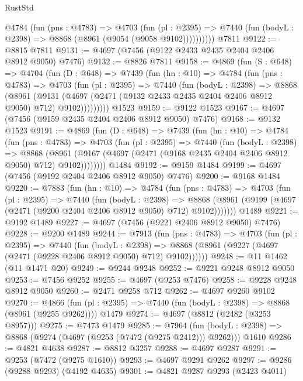 \begin{lexlean}{RustStd}
\begin{coremodule}
          @4784
            (fun (pns : @4783) =>
            @4703
              (fun (pl : @2395) =>
              @7440 (fun (bodyL : @2398) => @8868 (@8961 (@9054 (@9058 @9102))))))))))
    @7811
@9122 := @8815 @7811
@9131 := @4697 (@7456 (@9122 @2433 @2435 @2404 @2406 @8912 @9050) @7476)
@9132 := @8826 @7811
@9158 := @4869
    (fun (S : @648) =>
    @4704
      (fun (D : @648) =>
      @7439
        (fun (hn : @10) =>
        @4784
          (fun (pns : @4783) =>
          @4703
            (fun (pl : @2395) =>
            @7440
              (fun (bodyL : @2398) =>
              @8868
                (@8961
                  (@9131
                    (@4697 (@2471 (@9132 @2433 @2435 @2404 @2406 @8912 @9050) @712) @9102)))))))))
    @1523
@9159 := @9122 @1523
@9167 := @4697 (@7456 (@9159 @2435 @2404 @2406 @8912 @9050) @7476)
@9168 := @9132 @1523
@9191 := @4869
    (fun (D : @648) =>
    @7439
      (fun (hn : @10) =>
      @4784
        (fun (pns : @4783) =>
        @4703
          (fun (pl : @2395) =>
          @7440
            (fun (bodyL : @2398) =>
            @8868
              (@8961 (@9167 (@4697 (@2471 (@9168 @2435 @2404 @2406 @8912 @9050) @712) @9102))))))))
    @1484
@9192 := @9159 @1484
@9199 := @4697 (@7456 (@9192 @2404 @2406 @8912 @9050) @7476)
@9200 := @9168 @1484
@9220 := @7883
    (fun (hn : @10) =>
    @4784
      (fun (pns : @4783) =>
      @4703
        (fun (pl : @2395) =>
        @7440
          (fun (bodyL : @2398) =>
          @8868 (@8961 (@9199 (@4697 (@2471 (@9200 @2404 @2406 @8912 @9050) @712) @9102)))))))
    @1489
@9221 := @9192 @1489
@9227 := @4697 (@7456 (@9221 @2406 @8912 @9050) @7476)
@9228 := @9200 @1489
@9244 := @7913
    (fun (pns : @4783) =>
    @4703
      (fun (pl : @2395) =>
      @7440
        (fun (bodyL : @2398) =>
        @8868 (@8961 (@9227 (@4697 (@2471 (@9228 @2406 @8912 @9050) @712) @9102))))))
@9248 := @11 @1462 (@11 @1471 @20)
@9249 := @9244 @9248
@9252 := @9221 @9248 @8912 @9050
@9253 := @7456 @9252
@9255 := @4697 (@9253 @7476)
@9258 := @9228 @9248 @8912 @9050
@9260 := @2471 @9258 @712
@9262 := @4697 @9260 @9102
@9270 := @4866
    (fun (pl : @2395) => @7440 (fun (bodyL : @2398) => @8868 (@8961 (@9255 @9262))))
    @1479
@9274 := @4697 (@8812 (@2482 (@3253 @8957)))
@9275 := @7473 @1479
@9285 := @7964
    (fun (bodyL : @2398) => @8868 (@9274 (@4697 (@9253 (@7472 (@9275 @2412))) @9262)))
    @1610
@9286 := @4821 @4638
@9287 := @8812 @3257
@9288 := @4697 @9287
@9291 := @9253 (@7472 (@9275 @1610))
@9293 := @4697 @9291 @9262
@9297 := @9286 (@9288 @9293) (@4192 @4635)
@9301 := @4821 @9287 @9293 (@2423 @4011)

\end{coremodule}
\end{lexlean}
